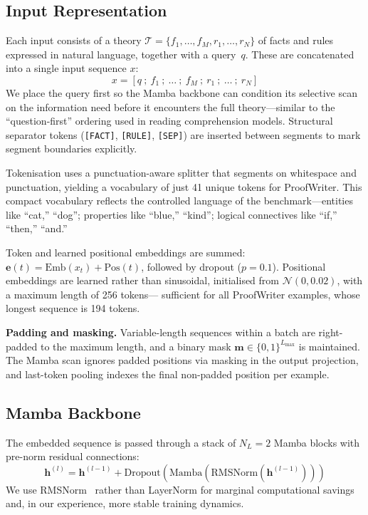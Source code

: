\documentclass[conference]{IEEEtran}
\begin{document}
\subsection{Input Representation}
\label{sec:input}

Each input consists of a theory $\mathcal{T} = \{f_1, \dots, f_M,
r_1, \dots, r_N\}$ of facts and rules expressed in natural
language, together with a query~$q$. These are concatenated into
a single input sequence $x$:
\begin{equation}
    x = [q\ ;\ f_1\ ;\ \dots\ ;\ f_M\ ;\ r_1\ ;\ \dots\ ;\ r_N]
\end{equation}
We place the query first so the Mamba backbone can condition its
selective scan on the information need before it encounters the
full theory---similar to the ``question-first'' ordering used in
reading comprehension models. Structural separator tokens
(\texttt{[FACT]}, \texttt{[RULE]}, \texttt{[SEP]}) are inserted
between segments to mark segment boundaries explicitly.

Tokenisation uses a punctuation-aware splitter that segments on
whitespace and punctuation, yielding a vocabulary of just 41
unique tokens for ProofWriter. This compact vocabulary reflects
the controlled language of the benchmark---entities like
``cat,'' ``dog''; properties like ``blue,'' ``kind''; logical
connectives like ``if,'' ``then,'' ``and.''

Token and learned positional embeddings are summed:
$\mathbf{e}(t) = \mathrm{Emb}(x_t) + \mathrm{Pos}(t)$,
followed by dropout ($p = 0.1$). Positional embeddings are
learned rather than sinusoidal, initialised from
$\mathcal{N}(0, 0.02)$, with a maximum length of 256 tokens---
sufficient for all ProofWriter examples, whose longest sequence
is 194 tokens.

\textbf{Padding and masking.} Variable-length sequences within
a batch are right-padded to the maximum length, and a binary
mask $\mathbf{m} \in \{0,1\}^{L_{\max}}$ is maintained. The
Mamba scan ignores padded positions via masking in the output
projection, and last-token pooling indexes the final non-padded
position per example.

\subsection{Mamba Backbone}
\label{sec:backbone}

The embedded sequence is passed through a stack of $N_L = 2$ Mamba
blocks with pre-norm residual connections:
\begin{equation}
    \mathbf{h}^{(l)} = \mathbf{h}^{(l-1)} +
    \mathrm{Dropout}\!\left(\mathrm{Mamba}\!\left(
    \mathrm{RMSNorm}(\mathbf{h}^{(l-1)})\right)\right)
\end{equation}
We use RMSNorm~\cite{zhang2019rms} rather than LayerNorm for
marginal computational savings and, in our experience, more
stable training dynamics.
\end{document}
